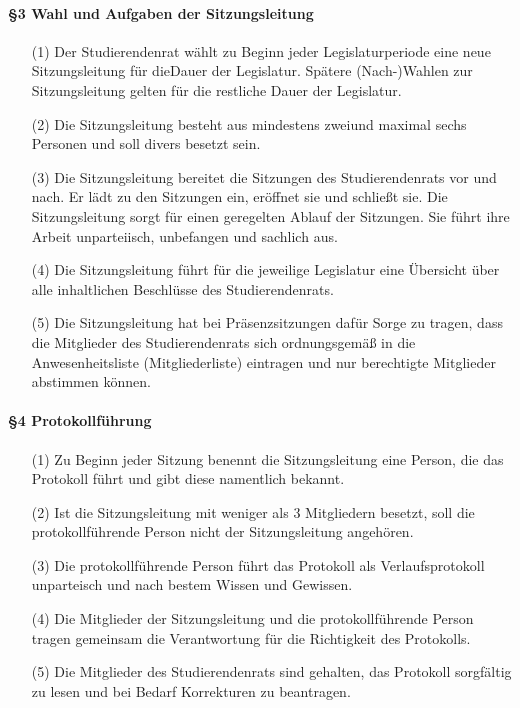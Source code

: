         \paragraph{§3 Wahl und Aufgaben der Sitzungsleitung}
            \begin{itemize}
                \item[(1)] Der Studierendenrat wählt zu Beginn jeder Legislaturperiode eine neue Sitzungsleitung für dieDauer der Legislatur. Spätere (Nach-)Wahlen zur Sitzungsleitung gelten für die restliche Dauer der Legislatur. 
                \item[(2)] Die Sitzungsleitung besteht aus mindestens zweiund maximal sechs Personen und soll divers besetzt sein. 
                \item[(3)] Die Sitzungsleitung bereitet die Sitzungen des Studierendenrats vor und nach. Er lädt zu den Sitzungen ein, eröffnet sie und schließt sie. Die Sitzungsleitung sorgt für einen geregelten Ablauf der Sitzungen. Sie führt ihre Arbeit unparteiisch, unbefangen und sachlich aus. %
                \item[(4)] Die Sitzungsleitung führt für die jeweilige Legislatur eine Übersicht über alle inhaltlichen Beschlüsse des Studierendenrats. 
                \item[(5)] Die Sitzungsleitung hat bei Präsenzsitzungen dafür Sorge zu tragen, dass die Mitglieder des Studierendenrats sich ordnungsgemäß in die Anwesenheitsliste (Mitgliederliste) eintragen und nur berechtigte Mitglieder abstimmen können. %
            \end{itemize}
        \paragraph{§4 Protokollführung}
            \begin{itemize}
                \item[(1)] Zu Beginn jeder Sitzung benennt die Sitzungsleitung eine Person, die das Protokoll führt und gibt diese namentlich bekannt.
                \item[(2)] Ist die Sitzungsleitung mit weniger als 3 Mitgliedern besetzt, soll die protokollführende Person nicht der Sitzungsleitung angehören.
                \item[(3)] Die protokollführende Person führt das Protokoll als Verlaufsprotokoll unparteisch und nach bestem Wissen und Gewissen.
                \item[(4)] Die Mitglieder der Sitzungsleitung und die protokollführende Person tragen gemeinsam die Verantwortung für die Richtigkeit des Protokolls.
                \item[(5)] Die Mitglieder des Studierendenrats sind gehalten, das Protokoll sorgfältig zu lesen und bei Bedarf Korrekturen zu beantragen. 
            \end{itemize}
